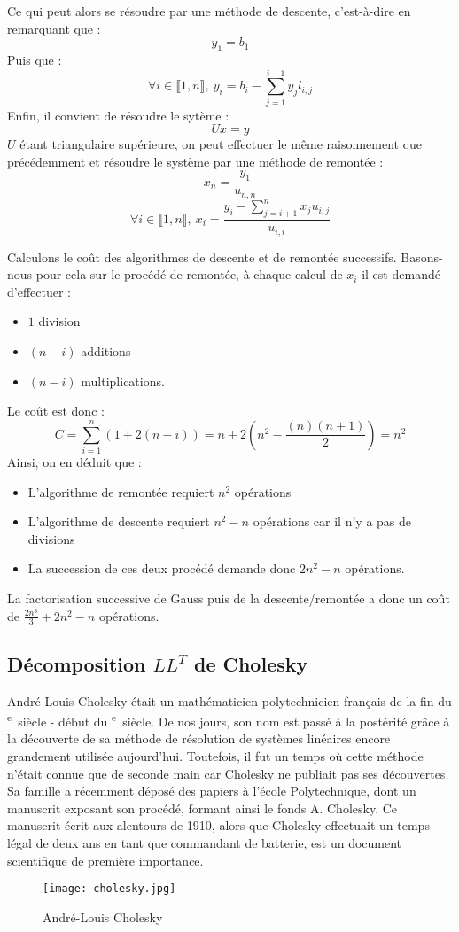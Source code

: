 \documentclass[a4paper, titlepage]{livret}													%
\def\siecle#1{\textsc{\romannumeral #1}\textsuperscript{e}~siècle} 							%
\begin{document}
			Ce qui peut alors se résoudre par une méthode de descente, c'est-à-dire en remarquant que :
				\[y_{1} = b_{1}\]
			Puis que :
				\[\forall i \in \llbracket 1,n \rrbracket,\ y_{i} = b_{i} - \sum_{j = 1}^{i-1} y_{j}l_{i, j} \] 
			Enfin, il convient de résoudre le sytème :
				\[Ux = y\]
			$U$ étant triangulaire supérieure, on peut effectuer le même raisonnement que précédemment et résoudre le système par une méthode de remontée :
				\[x_{n} = \frac{y_{1}}{u_{n,n}}\]
				\[\forall i \in \llbracket 1,n \rrbracket,\ x_{i} = \frac{y_{i} - \sum_{j = i+1}^{n} x_{j}u_{i, j}}{u_{i,i}} \]

			\newpage
			Calculons le coût des algorithmes de descente et de remontée successifs.
			Basons-nous pour cela sur le procédé de remontée, à chaque calcul de $x_{i}$ il est demandé d'effectuer :
			\begin{itemize}
				\item $1$ division
				\item $(n - i)$ additions
				\item $(n - i)$ multiplications.
			\end{itemize}
			Le coût est donc :
				\[C = \sum_{i = 1}^{n} (1 + 2(n - i)) = n + 2(n^{2} - \frac{(n)(n + 1)}{2}) = n^{2}\]
			Ainsi, on en déduit que :
			\begin{itemize}
				\item L'algorithme de remontée requiert $n^{2}$ opérations
				\item L'algorithme de descente requiert $n^{2} - n$ opérations car il n'y a pas de divisions
				\item La succession de ces deux procédé demande donc $2n^{2} - n$ opérations.
			\end{itemize}
			La factorisation successive de Gauss puis de la descente/remontée a donc un coût de $\frac{2n^{3}}{3} + 2n^{2} - n$ opérations.

		\subsection{Décomposition $LL^{T}$ de Cholesky}
			André-Louis Cholesky était un mathématicien polytechnicien français de la fin du \siecle{19} - début du \siecle{20}. De nos jours, son nom est passé à la postérité grâce à la découverte de sa méthode de résolution de systèmes linéaires encore grandement utilisée aujourd'hui. Toutefois, il fut un temps où cette méthode n'était connue que de seconde main car Cholesky ne publiait pas ses découvertes. Sa famille a récemment déposé des papiers à l'école Polytechnique, dont un manuscrit exposant son procédé, formant ainsi le fonds A. Cholesky.
			Ce manuscrit écrit aux alentours de 1910, alors que Cholesky effectuait un temps légal de deux ans en tant que commandant de batterie, est un document scientifique de première importance.
			\begin{figure}[!ht]
				\centering
  					\texttt{[image: cholesky.jpg]}
  					\caption{André-Louis Cholesky}
			\end{figure}
			
\end{document}
